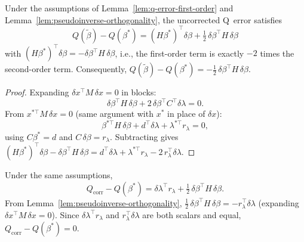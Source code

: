 \begin{corollary}\label{cor:taylor-structure}
Under the assumptions of Lemma~\ref{lem:q-error-first-order} and
Lemma~\ref{lem:pseudoinverse-orthogonality}, the uncorrected Q~error satisfies
\[
  Q(\tilde\beta) - Q(\beta^*)
  = (H\beta^*)^\top\delta\beta + \tfrac{1}{2}\,\delta\beta^\top H\,\delta\beta
\]
with $(H\beta^*)^\top\delta\beta = -\delta\beta^\top H\,\delta\beta$,
i.e., the first-order term is exactly $-2$ times the second-order term.
Consequently, $Q(\tilde\beta) - Q(\beta^*) = -\tfrac{1}{2}\,\delta\beta^\top H\,\delta\beta$.
\end{corollary}

\begin{proof}
Expanding $\delta x^\top M\,\delta x = 0$ in blocks:
\[
  \delta\beta^\top H\,\delta\beta + 2\,\delta\beta^\top C^\top\delta\lambda = 0.
\]
From $x^{*\top} M\,\delta x = 0$ (same argument with $x^*$ in place of $\delta x$):
\[
  \beta^{*\top} H\,\delta\beta + d^\top\delta\lambda + \lambda^{*\top} r_\lambda = 0,
\]
using $C\beta^* = d$ and $C\,\delta\beta = r_\lambda$.
Subtracting gives
$(H\beta^*)^\top\delta\beta - \delta\beta^\top H\,\delta\beta
= d^\top\delta\lambda + \lambda^{*\top} r_\lambda - 2\,r_\lambda^\top\delta\lambda$.
\end{proof}


\begin{corollary}\label{cor:exact-correction}
Under the same assumptions,
\[
  Q_{\mathrm{corr}} - Q(\beta^*)
  = \delta\lambda^\top r_\lambda + \tfrac{1}{2}\,\delta\beta^\top H\,\delta\beta.
\]
From Lemma~\ref{lem:pseudoinverse-orthogonality},
$\tfrac{1}{2}\,\delta\beta^\top H\,\delta\beta = -r_\lambda^\top\delta\lambda$
(expanding $\delta x^\top M\,\delta x = 0$).
Since $\delta\lambda^\top r_\lambda$ and $r_\lambda^\top\delta\lambda$ are
both scalars and equal, $Q_{\mathrm{corr}} - Q(\beta^*) = 0$.
\end{corollary}
